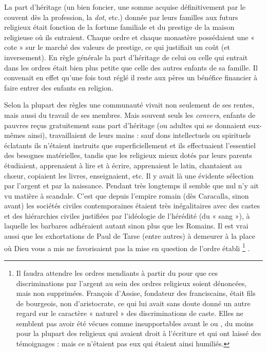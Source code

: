  La part d'héritage (un bien foncier, une somme acquise définitivement par le couvent dès la profession, la \emph{dot}, etc.) donnée par leurs familles aux futurs religieux était fonction de la fortune familiale et du prestige de la maison religieuse où ils entraient. Chaque ordre et chaque monastère possédaient une « cote » sur le marché des valeurs de prestige, ce qui justifiait un coût (et inversement). En règle générale la part d'héritage de celui ou celle qui entrait dans les ordres était bien plus petite que celle des autres enfants de sa famille. Il convenait en effet qu'une fois tout réglé il reste aux pères un bénéfice financier à faire entrer des enfants en religion. 

 Selon la plupart des règles une communauté vivait non seulement de ses rentes, mais aussi du travail de ses membres. Mais souvent seuls les \emph{convers}, enfants de pauvres reçus gratuitement sans part d'héritage (ou adultes qui se donnaient eux-mêmes ainsi), travaillaient de leurs mains : sauf dons intellectuels ou spirituels éclatants ils n'étaient instruits que superficiellement et ils effectuaient l'essentiel des besognes matérielles, tandis que les religieux mieux dotés par leurs parents étudiaient, apprenaient à lire et à écrire, apprenaient le latin, chantaient au chœur, copiaient les livres, enseignaient, etc. Il y avait là une évidente sélection par l'argent et par la naissance. Pendant très longtemps il semble que nul n'y ait vu matière à scandale. C'est que depuis l'empire romain (dès Caracalla, sinon avant) les sociétés civiles contemporaines étaient très inégalitaires avec des castes et des hiérarchies civiles justifiées par l'idéologie de l'hérédité (du « sang »), à laquelle les barbares adhéraient autant sinon plus que les Romains. Il est vrai aussi que les exhortations de Paul de Tarse (entre autres) à demeurer à la place où Dieu vous a mis ne favorisaient pas la mise en question de l'ordre établi%
\footnote{Il faudra attendre les ordres mendiants à partir du  pour que ces discriminations par l'argent au sein des ordres religieux soient dénoncées, mais non supprimées. François d'Assise, fondateur des franciscains, était fils de bourgeois, non d'aristocrate, ce qui lui avait sans doute donné un autre regard sur le caractère « naturel » des discriminations de caste. Elles ne semblent pas avoir été vécues comme insupportables avant le  ou , du moins pour la plupart des religieux qui avaient droit à l'écriture et qui ont laissé des témoignages : mais ce n'étaient pas eux qui étaient ainsi humiliés.}%
. 

